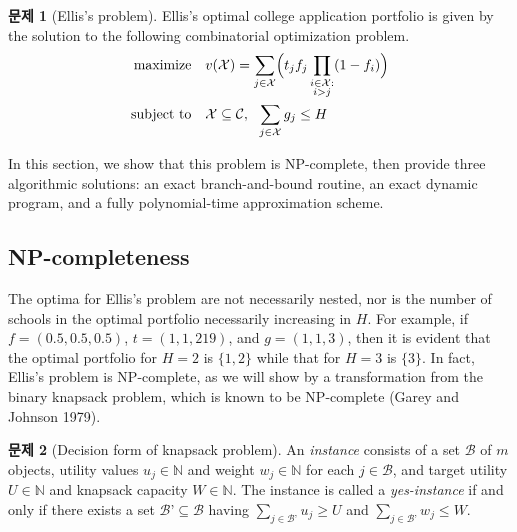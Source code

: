 \documentclass[12pt]{article} %
\newif\ifen
\theoremstyle{definition}
\newtheorem{problem}{Problem}
\theoremstyle{definition}
\newtheorem{problem}{문제}
\begin{document}
\begin{problem}[Ellis's problem]
Ellis's optimal college application portfolio is given by the solution to the following combinatorial optimization problem.
\begin{align}
\begin{split}
\text{maximize}\quad &  v(\mathcal{X}) = \sum_{j\in
\mathcal{X}} \Bigl( t_j f_j  \prod_{\substack{i \in \mathcal{X}: \\ i > j}} (1 - f_{i}) \Bigr)\\
\text{subject to}\quad & \mathcal{X}\subseteq\mathcal{C},~~\sum_{j \in \mathcal{X}} g_j \leq H 
\end{split}
\end{align}
\end{problem}

In this section, we show that this problem is NP-complete, then provide three algorithmic solutions: an exact branch-and-bound routine, an exact dynamic program, and a fully polynomial-time approximation scheme.

\ifen \subsection{NP-completeness} \else \subsection{NP-completeness}\fi
The optima for Ellis's problem are not necessarily nested, nor is the number of schools in the optimal portfolio necessarily increasing in $H$. For example, if
$f = (0.5, 0.5, 0.5)$, $t = (1, 1, 219)$, and $g = (1, 1, 3)$,
then it is evident that the optimal portfolio for $H = 2$ is $\{1, 2\}$ while that for $H = 3$ is $\{3\}$. In fact, Ellis’s problem is NP-complete, as we will show by a transformation from the binary knapsack problem, which is known to be NP-complete (Garey and Johnson 1979).

\begin{problem}[Decision form of knapsack problem]
An \emph{instance} consists of a set $\mathcal{B}$ of $m$ objects, utility values $u_j \in \mathbb{N}$ and weight $w_j \in \mathbb{N}$ for each $j \in \mathcal{B}$, and target utility $U\in \mathbb{N}$ and knapsack capacity $W\in \mathbb{N}$. The instance is called a \emph{yes-instance} if and only if there exists a set $\mathcal{B’} \subseteq \mathcal{B}$ having $\sum_{j \in \mathcal{B’}} u_j \geq U$ and  $\sum_{j \in \mathcal{B’}} w_j \leq W$.
\end{problem}
\end{document}
